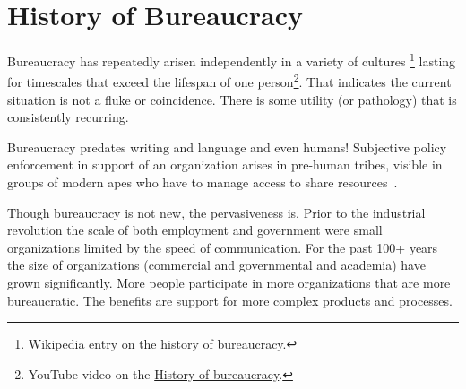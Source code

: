 \section{History of Bureaucracy\label{sec:history}}


Bureaucracy has repeatedly arisen independently in a variety of cultures
\footnote{Wikipedia entry on the \href{https://en.wikipedia.org/wiki/Bureaucracy\%23History}{history of bureaucracy}.}
lasting for timescales that exceed the lifespan of one person\footnote{YouTube video on the \href{https://www.youtube.com/watch?v=B_nsZlcC12g}{History of bureaucracy}.}. That indicates the current situation is not a fluke or coincidence. There is some utility (or pathology) that is consistently recurring. 


Bureaucracy predates writing and language and even humans! Subjective policy enforcement in support of an organization arises in pre-human tribes, visible in groups of modern apes who have to manage access to share resources~\cite{2016_Suchak}. 



Though bureaucracy is not new, the pervasiveness is. Prior to the industrial revolution the scale of both employment and government were small organizations limited by the speed of communication. For the past 100+ years the size of organizations (commercial and governmental and academia) have grown significantly. More people participate in more organizations that are more bureaucratic. The benefits are support for more complex products and processes. 



